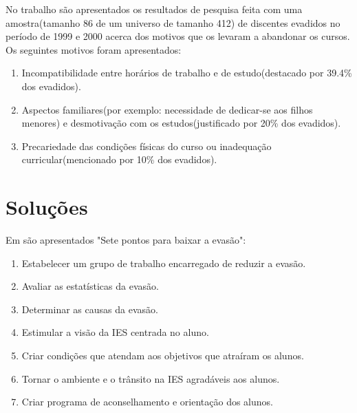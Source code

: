 No trabalho \cite{andriola} são apresentados os resultados de pesquisa feita com uma amostra(tamanho 86 de um universo de tamanho 412) de discentes evadidos no período de 1999 e 2000 acerca dos motivos que os levaram a abandonar os cursos. Os seguintes motivos foram apresentados:

\begin{enumerate}

\item Incompatibilidade entre horários de trabalho e de estudo(destacado por 39.4\% dos evadidos).

\item Aspectos familiares(por exemplo: necessidade de dedicar-se aos filhos menores) e desmotivação com os estudos(justificado por 20\% dos evadidos).

\item Precariedade das condições físicas do curso ou inadequação curricular(mencionado por 10\% dos evadidos).

\end{enumerate}

\section{Soluções}

Em \cite{evasao_panorama2} são apresentados "Sete pontos para baixar a evasão":

\begin{enumerate}

\item Estabelecer um grupo de trabalho encarregado de reduzir a evasão.

\item Avaliar as estatísticas da evasão.

\item Determinar as causas da evasão.

\item Estimular a visão da IES centrada no aluno.

\item Criar condições que atendam aos objetivos que atraíram os alunos.

\item Tornar o ambiente e o trânsito na IES agradáveis aos alunos.

\item Criar programa de aconselhamento e orientação dos alunos.

\end{enumerate}

